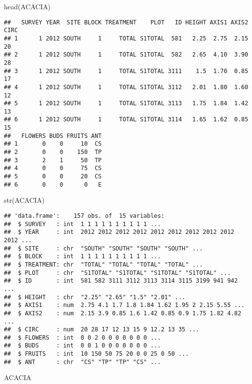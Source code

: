 \documentclass[
]{article}
\newenvironment{Shaded}{\begin{snugshade}}{\end{snugshade}}
\newcommand{\FunctionTok}[1]{\textcolor[rgb]{0.00,0.00,0.00}{#1}}
\newcommand{\NormalTok}[1]{#1}
\begin{document}
\begin{Shaded}
\begin{Highlighting}[]
\FunctionTok{head}\NormalTok{(ACACIA)}
\end{Highlighting}
\end{Shaded}

\begin{verbatim}
##   SURVEY YEAR  SITE BLOCK TREATMENT    PLOT   ID HEIGHT AXIS1 AXIS2 CIRC
## 1      1 2012 SOUTH     1     TOTAL S1TOTAL  581   2.25  2.75  2.15   20
## 2      1 2012 SOUTH     1     TOTAL S1TOTAL  582   2.65  4.10  3.90   28
## 3      1 2012 SOUTH     1     TOTAL S1TOTAL 3111    1.5  1.70  0.85   17
## 4      1 2012 SOUTH     1     TOTAL S1TOTAL 3112   2.01  1.80  1.60   12
## 5      1 2012 SOUTH     1     TOTAL S1TOTAL 3113   1.75  1.84  1.42   13
## 6      1 2012 SOUTH     1     TOTAL S1TOTAL 3114   1.65  1.62  0.85   15
##   FLOWERS BUDS FRUITS ANT
## 1       0    0     10  CS
## 2       0    0    150  TP
## 3       2    1     50  TP
## 4       0    0     75  CS
## 5       0    0     20  CS
## 6       0    0      0   E
\end{verbatim}

\begin{Shaded}
\begin{Highlighting}[]
\FunctionTok{str}\NormalTok{(ACACIA)}
\end{Highlighting}
\end{Shaded}

\begin{verbatim}
## 'data.frame':    157 obs. of  15 variables:
##  $ SURVEY   : int  1 1 1 1 1 1 1 1 1 1 ...
##  $ YEAR     : int  2012 2012 2012 2012 2012 2012 2012 2012 2012 2012 ...
##  $ SITE     : chr  "SOUTH" "SOUTH" "SOUTH" "SOUTH" ...
##  $ BLOCK    : int  1 1 1 1 1 1 1 1 1 1 ...
##  $ TREATMENT: chr  "TOTAL" "TOTAL" "TOTAL" "TOTAL" ...
##  $ PLOT     : chr  "S1TOTAL" "S1TOTAL" "S1TOTAL" "S1TOTAL" ...
##  $ ID       : int  581 582 3111 3112 3113 3114 3115 3199 941 942 ...
##  $ HEIGHT   : chr  "2.25" "2.65" "1.5" "2.01" ...
##  $ AXIS1    : num  2.75 4.1 1.7 1.8 1.84 1.62 1.95 2 2.15 5.55 ...
##  $ AXIS2    : num  2.15 3.9 0.85 1.6 1.42 0.85 0.9 1.75 1.82 4.82 ...
##  $ CIRC     : num  20 28 17 12 13 15 9 12.2 13 35 ...
##  $ FLOWERS  : int  0 0 2 0 0 0 0 0 0 0 ...
##  $ BUDS     : int  0 0 1 0 0 0 0 0 0 0 ...
##  $ FRUITS   : int  10 150 50 75 20 0 0 25 0 50 ...
##  $ ANT      : chr  "CS" "TP" "TP" "CS" ...
\end{verbatim}

\begin{Shaded}
\begin{Highlighting}[]
\NormalTok{ACACIA}
\end{Highlighting}
\end{Shaded}
\end{document}
